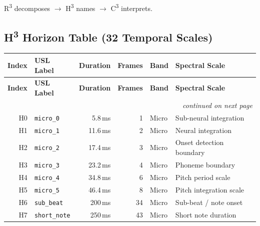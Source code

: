 \noindent
R\textsuperscript{3} decomposes $\to$ H\textsuperscript{3} names $\to$ C\textsuperscript{3} interprets.

\bigskip

\subsection{H\textsuperscript{3} Horizon Table (32 Temporal Scales)}
\label{tab:h3-horizon}

\begin{longtable}{
  r
  l
  r
  r
  l
  l
}
\toprule
\textbf{Index} & \textbf{USL Label} & \textbf{Duration} & \textbf{Frames} & \textbf{Band} & \textbf{Spectral Scale} \\
\midrule
\endfirsthead

\toprule
\textbf{Index} & \textbf{USL Label} & \textbf{Duration} & \textbf{Frames} & \textbf{Band} & \textbf{Spectral Scale} \\
\midrule
\endhead

\midrule
\multicolumn{6}{r}{\footnotesize\itshape continued on next page} \\
\endfoot

\bottomrule
\endlastfoot

\rowcolor{cyan!8}
H0  & \texttt{micro\_0}    & 5.8\,ms    & 1      & Micro & Sub-neural integration     \\
\rowcolor{cyan!8}
H1  & \texttt{micro\_1}    & 11.6\,ms   & 2      & Micro & Neural integration         \\
\rowcolor{cyan!8}
H2  & \texttt{micro\_2}    & 17.4\,ms   & 3      & Micro & Onset detection boundary   \\
\rowcolor{cyan!8}
H3  & \texttt{micro\_3}    & 23.2\,ms   & 4      & Micro & Phoneme boundary           \\
\rowcolor{cyan!8}
H4  & \texttt{micro\_4}    & 34.8\,ms   & 6      & Micro & Pitch period scale         \\
\rowcolor{cyan!8}
H5  & \texttt{micro\_5}    & 46.4\,ms   & 8      & Micro & Pitch integration scale    \\
\rowcolor{cyan!8}
H6  & \texttt{sub\_beat}   & 200\,ms    & 34     & Micro & Sub-beat / note onset      \\
\rowcolor{cyan!8}
H7  & \texttt{short\_note} & 250\,ms    & 43     & Micro & Short note duration        \\


\end{longtable}

